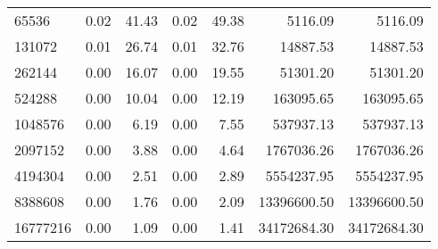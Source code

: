 \begin{tabular}{lrrrrrr}
65536    &        0.02 &         41.43 &           0.02 &        49.38 &          5116.09 &         5116.09 \\
131072   &        0.01 &         26.74 &           0.01 &        32.76 &         14887.53 &        14887.53 \\
262144   &        0.00 &         16.07 &           0.00 &        19.55 &         51301.20 &        51301.20 \\
524288   &        0.00 &         10.04 &           0.00 &        12.19 &        163095.65 &       163095.65 \\
1048576  &        0.00 &          6.19 &           0.00 &         7.55 &        537937.13 &       537937.13 \\
2097152  &        0.00 &          3.88 &           0.00 &         4.64 &       1767036.26 &      1767036.26 \\
4194304  &        0.00 &          2.51 &           0.00 &         2.89 &       5554237.95 &      5554237.95 \\
8388608  &        0.00 &          1.76 &           0.00 &         2.09 &      13396600.50 &     13396600.50 \\
16777216 &        0.00 &          1.09 &           0.00 &         1.41 &      34172684.30 &     34172684.30 \\
\bottomrule
\end{tabular}
